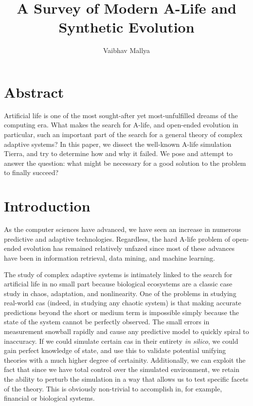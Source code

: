 \documentclass[11pt, twocolumn]{article}
\begin{document}
\title{A Survey of Modern A-Life and Synthetic Evolution}
\author{Vaibhav Mallya}
\maketitle
\section{Abstract}

Artificial life is one of the most sought-after yet most-unfulfilled dreams of the computing era.
What makes the search for A-life, and open-ended evolution in particular, such an important part of the search for a general theory of complex adaptive systems?
In this paper, we dissect the well-known A-life simulation Tierra, and try to determine how and why it failed. We pose and attempt to answer the question: what might be necessary for a good solution to the problem to finally succeed?

\section{Introduction}
As the computer sciences have advanced, we have seen an increase in numerous predictive and adaptive technologies. Regardless, the hard A-life problem of open-ended evolution has remained relatively unfazed since most of these advances have been in information retrieval, data mining, and machine learning.

The study of complex adaptive systems is intimately linked to the search for artificial life in no small part because biological ecosystems are a classic case study in chaos, adaptation, and nonlinearity. One of the problems in studying real-world cas (indeed, in studying any chaotic system) is that making accurate predictions beyond the short or medium term is impossible simply because the state of the system cannot be perfectly observed. The small errors in measurement snowball rapidly and cause any predictive model to quickly spiral to inaccuracy. If we could simulate certain cas in their entirety \emph{in silico}, we could gain perfect knowledge of state, and use this to validate potential unifying theories with a much higher degree of certainity. Additionally, we can exploit the fact that since we have total control over the simulated environment, we retain the ability to perturb the simulation in a way that allows us to test specific facets of the theory. This is obviously non-trivial to accomplish in, for example, financial or biological systems.
\end{document}
